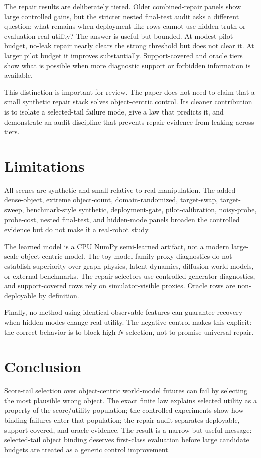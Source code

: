 \documentclass[10pt]{article}
\begin{document}
The repair results are deliberately tiered. Older combined-repair panels show large controlled gains, but the stricter nested final-test audit asks a different question: what remains when deployment-like rows cannot use hidden truth or evaluation real utility? The answer is useful but bounded. At modest pilot budget, no-leak repair nearly clears the strong threshold but does not clear it. At larger pilot budget it improves substantially. Support-covered and oracle tiers show what is possible when more diagnostic support or forbidden information is available.

This distinction is important for review. The paper does not need to claim that a small synthetic repair stack solves object-centric control. Its cleaner contribution is to isolate a selected-tail failure mode, give a law that predicts it, and demonstrate an audit discipline that prevents repair evidence from leaking across tiers.

\section{Limitations}

All scenes are synthetic and small relative to real manipulation. The added dense-object, extreme object-count, domain-randomized, target-swap, target-sweep, benchmark-style synthetic, deployment-gate, pilot-calibration, noisy-probe, probe-cost, nested final-test, and hidden-mode panels broaden the controlled evidence but do not make it a real-robot study.

The learned model is a CPU NumPy semi-learned artifact, not a modern large-scale object-centric model. The toy model-family proxy diagnostics do not establish superiority over graph physics, latent dynamics, diffusion world models, or external benchmarks. The repair selectors use controlled generator diagnostics, and support-covered rows rely on simulator-visible proxies. Oracle rows are non-deployable by definition.

Finally, no method using identical observable features can guarantee recovery when hidden modes change real utility. The negative control makes this explicit: the correct behavior is to block high-$N$ selection, not to promise universal repair.

\section{Conclusion}

Score-tail selection over object-centric world-model futures can fail by selecting the most plausible wrong object. The exact finite law explains selected utility as a property of the score/utility population; the controlled experiments show how binding failures enter that population; the repair audit separates deployable, support-covered, and oracle evidence. The result is a narrow but useful message: selected-tail object binding deserves first-class evaluation before large candidate budgets are treated as a generic control improvement.
\end{document}
